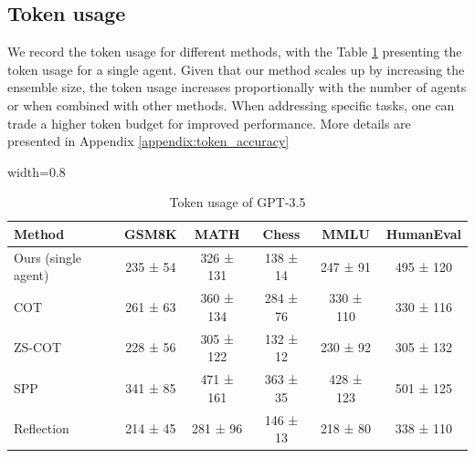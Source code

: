{\subsection{Token usage}
We record the token usage for different methods, with the Table \ref{table:token_cost} presenting the token usage for a single agent. Given that our method scales up by increasing the ensemble size, the token usage increases proportionally with the number of agents or when combined with other methods. When addressing specific tasks, one can trade a higher token budget for improved performance. More details are presented in Appendix \ref{appendix:token_accuracy}

\begin{table}[ht!]
\caption{Token usage of GPT-3.5}
\label{table:token_cost}
\begin{center}
\begin{adjustbox}{width=0.8\linewidth}
\begin{tabular}{lccccc}
\toprule
\textbf{Method} & \textbf{GSM8K} & \textbf{MATH} & \textbf{Chess} & \textbf{MMLU} & \textbf{HumanEval} \\
\midrule
Ours (single agent) & 235 ± 54 & 326 ± 131 & 138 ± 14 & 247 ± 91 & 495 ± 120 \\
COT \cite{cot} & 261 ± 63 & 360 ± 134 & 284 ± 76 & 330 ± 110 & 330 ± 116 \\
ZS-COT \cite{zs-cot} & 228 ± 56 & 305 ± 122 & 132 ± 12 & 230 ± 92 & 305 ± 132 \\
SPP \cite{spp} & 341 ± 85 & 471 ± 161 & 363 ± 35 & 428 ± 123 & 501 ± 125 \\
Reflection \cite{reflexion} & 214 ± 45 & 281 ± 96 & 146 ± 13 & 218 ± 80 &338 ± 110 \\ \bottomrule
\end{tabular}
\end{adjustbox}
\end{center}
\end{table}
}